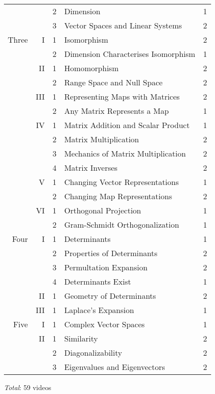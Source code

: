 \documentclass{article}
\begin{document}
\begin{center}
\begin{tabular}{|rrc|ll|}
      &    &2 &Dimension                          &1   \\
      &    &3 &Vector Spaces and Linear Systems   &2   \\
 \hline
 Three&I   &1 &Isomorphism                        &2   \\
      &    &2 &Dimension Characterises Isomorphism&1   \\
      \cline{4-5}
      &II  &1 &Homomorphism                       &2   \\
      &    &2 &Range Space and Null Space         &2   \\
      \cline{4-5}
      &III &1 &Representing Maps with Matrices    &2   \\
      &    &2 &Any Matrix Represents a Map        &1   \\
      \cline{4-5}
      &IV  &1 &Matrix Addition and Scalar Product &1   \\
      &    &2 &Matrix Multiplication              &2   \\
      &    &3 &Mechanics of Matrix Multiplication &2   \\
      &    &4 &Matrix Inverses                    &2   \\
      \cline{4-5}
      &V   &1 &Changing Vector Representations    &1   \\
      &    &2 &Changing Map Representations       &2   \\
      \cline{4-5}
      &VI  &1 &Orthogonal Projection              &1   \\
      &    &2 &Gram-Schmidt Orthogonalization     &1   \\
  \hline
 Four &I   &1 &Determinants                       &1   \\
      &    &2 &Properties of Determinants         &2   \\
      &    &3 &Permultation Expansion             &2   \\
      &    &4 &Determinants Exist                 &1   \\
      \cline{4-5}
      &II  &1 &Geometry of Determinants           &2   \\
      \cline{4-5}
      &III &1 &Laplace's Expansion                &1   \\
 \hline
 Five &I   &1 &Complex Vector Spaces              &1   \\
      \cline{4-5}
      &II  &1 &Similarity                         &2   \\
      &    &2 &Diagonalizability                  &2   \\
      &    &3 &Eigenvalues and Eigenvectors       &2   \\
 \hline
\end{tabular}
\end{center}
\vspace{1ex}
\textit{Total}: 59 videos
\end{document}
